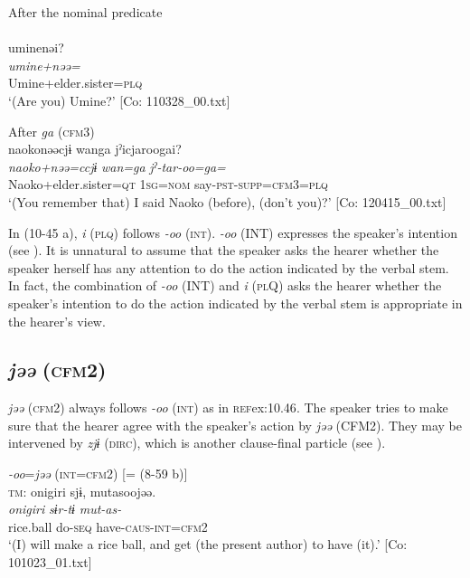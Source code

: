   \ex After the nominal predicate\\\\
      \glll    uminenəi?\\
    \textit{umine+nəə=}\\
    Umine+elder.sister=\textsc{plq}\\
\glt     ‘(Are you) Umine?’  [Co: 110328\_00.txt]

  \ex After \textit{ga} (\textsc{cfm}3)\\
      \glll    naokonəəcjɨ  wanga  jˀicjaroogai?\\
    \textit{naoko+nəə=ccjɨ}  \textit{wan=ga}  \textit{jˀ-tar-oo=ga=}\\
    Naoko+elder.sister=\textsc{qt}  1\textsc{sg}=\textsc{nom}  say-\textsc{pst}-\textsc{supp}=\textsc{cfm}3=\textsc{plq}\\
  \glt     ‘(You remember that) I said Naoko (before), (don’t you)?’  [Co: 120415\_00.txt]
  \z
\z

In (10-45 a), \textit{i} (\textsc{plq}) follows \textit{{}-oo} (\textsc{int}). \textit{{}-oo} (INT) expresses the speaker’s intention (see ). It is unnatural to assume that the speaker asks the hearer whether the speaker herself has any attention to do the action indicated by the verbal stem. In fact, the combination of \textit{{}-oo} (INT) and \textit{i} (\textsc{pl}Q) asks the hearer whether the speaker’s intention to do the action indicated by the verbal stem is appropriate in the hearer’s view.

\subsection{\textit{jəə} (\textsc{cfm}2)}\label{sec:10.3.4}

\textit{jəə} (\textsc{cfm}2) always follows \textit{-oo} (\textsc{int}) as in \textsc{ref}{ex:10.46}. The speaker tries to make sure that the hearer agree with the speaker’s action by \textit{jəə} (CFM2). They may be intervened by \textit{zjɨ} (\textsc{dirc}), which is another clause-final particle (see ).

\ea\label{ex:10.46}   \textit{{}-oo}=\textit{jəə} (\textsc{int}=\textsc{cfm}2) [= (8-59 b)]\\
  \ea \textsc{tm}:
      \glll    {\textbar}onigiri{\textbar}  sjɨ,  mutasoojəə.\\
      \textit{onigiri}  \textit{sɨr-tɨ}  \textit{mut-as-}\\
      rice.ball  do-\textsc{seq}  have-\textsc{caus}-\textsc{int}=\textsc{cfm}2\\
      \glt       ‘(I) will make a rice ball, and get (the present author) to have (it).’ [Co: 101023\_01.txt]


